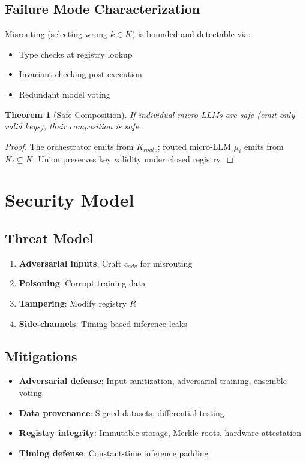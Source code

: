 \documentclass[11pt,a4paper]{article}
\newtheorem{theorem}{Theorem}[section]
\begin{document}
\subsection{Failure Mode Characterization}

Misrouting (selecting wrong $k \in K$) is bounded and detectable via:
\begin{itemize}
    \item Type checks at registry lookup
    \item Invariant checking post-execution
    \item Redundant model voting
\end{itemize}

\begin{theorem}[Safe Composition]
If individual micro-LLMs are safe (emit only valid keys), their composition is safe.
\end{theorem}

\begin{proof}
The orchestrator emits from $K_{route}$; routed micro-LLM $\mu_i$ emits from $K_i \subseteq K$. Union preserves key validity under closed registry.
\end{proof}

\section{Security Model}
\label{sec:security}

\subsection{Threat Model}

\begin{enumerate}
    \item \textbf{Adversarial inputs}: Craft $c_{adv}$ for misrouting
    \item \textbf{Poisoning}: Corrupt training data
    \item \textbf{Tampering}: Modify registry $R$
    \item \textbf{Side-channels}: Timing-based inference leaks
\end{enumerate}

\subsection{Mitigations}

\begin{itemize}
    \item \textbf{Adversarial defense}: Input sanitization, adversarial training, ensemble voting
    \item \textbf{Data provenance}: Signed datasets, differential testing
    \item \textbf{Registry integrity}: Immutable storage, Merkle roots, hardware attestation
    \item \textbf{Timing defense}: Constant-time inference padding
\end{itemize}
\end{document}
